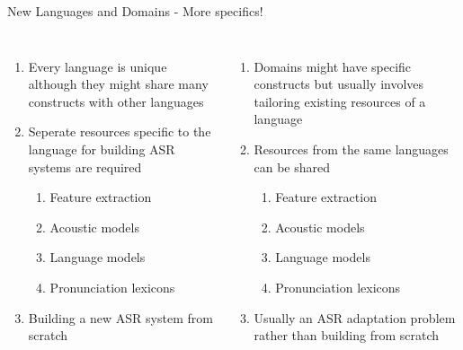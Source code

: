 \begin{frame}{New Languages and Domains - More specifics!}
\begin{columns}[T]
\column{2in}
\centering
{\color{orange}{New Languages}}
\begin{enumerate}
\item Every language is \alert{unique} although they might share many constructs with other languages
\item \alert{Seperate resources} specific to the language for building ASR systems are required
\begin{enumerate}
\item Feature extraction
\item Acoustic models
\item Language models
\item Pronunciation lexicons
\end{enumerate}
\item \alert{Building a new ASR system from scratch}
\end{enumerate}
\column{2in}
\centering
{\color{ForestGreen}{New Domains}}
\begin{enumerate}
\item Domains might have specific constructs but usually involves \alert{tailoring existing resources} of a language
\item Resources from the same languages can be \alert{shared}
\begin{enumerate}
\item Feature extraction
\item Acoustic models
\item Language models
\item Pronunciation lexicons
\end{enumerate}
\item Usually \alert{an ASR adaptation problem} rather than building from scratch
\end{enumerate}
\end{columns}
\end{frame}
